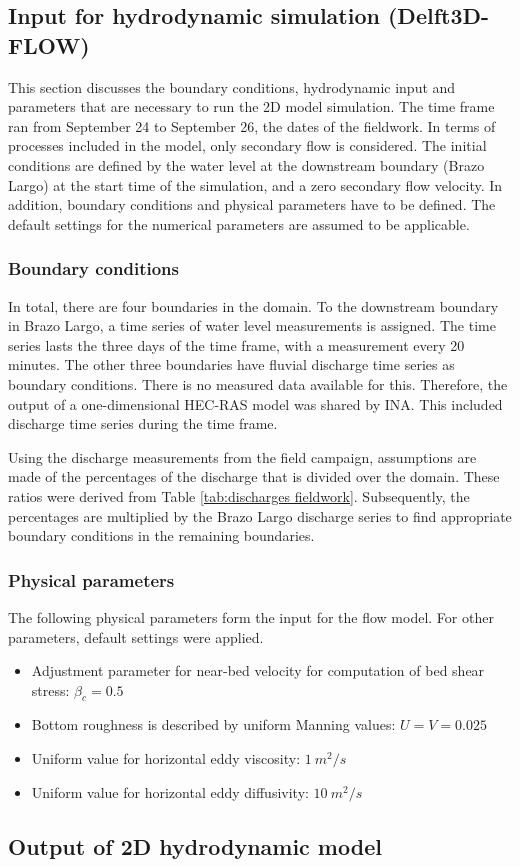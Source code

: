 \subsection{Input for hydrodynamic simulation (Delft3D-FLOW)}
\label{sec:flow input}
This section discusses the boundary conditions, hydrodynamic input and parameters that are necessary to run the 2D model simulation. The time frame ran from September 24 to September 26, the dates of the fieldwork. In terms of processes included in the model, only secondary flow is considered. The initial conditions are defined by the water level at the downstream boundary (Brazo Largo) at the start time of the simulation, and a zero secondary flow velocity. In addition, boundary conditions and physical parameters have to be defined. The default settings for the numerical parameters are assumed to be applicable. 

\subsubsection{Boundary conditions}
In total, there are four boundaries in the domain. To the downstream boundary in Brazo Largo, a time series of water level measurements is assigned. The time series lasts the three days of the time frame, with a measurement every 20 minutes. The other three boundaries have fluvial discharge time series as boundary conditions. There is no measured data available for this. Therefore, the output of a one-dimensional HEC-RAS model was shared by INA. This included discharge time series during the time frame. 

Using the discharge measurements from the field campaign, assumptions are made of the percentages of the discharge that is divided over the domain. These ratios were derived from Table \ref{tab:discharges fieldwork}. Subsequently, the percentages are multiplied by the Brazo Largo discharge series to find appropriate boundary conditions in the remaining boundaries.

\subsubsection{Physical parameters}
The following physical parameters form the input for the flow model. For other parameters, default settings were applied. 

\begin{itemize}
    \item Adjustment parameter for near-bed velocity for computation of bed shear stress: $\beta_c = 0.5$
    \item Bottom roughness is described by uniform Manning values: $U = V = 0.025$
    \item Uniform value for horizontal eddy viscosity: $1 ~m^2/s$
    \item Uniform value for horizontal eddy diffusivity: $10 ~m^2/s$
\end{itemize}


\subsection{Output of 2D hydrodynamic model}